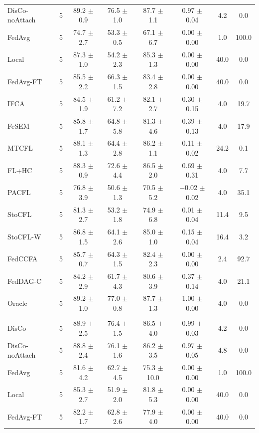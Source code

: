 {{\begin{tabular}{l r c c c c c c}
DisCo-noAttach & 5 & 89.2 $\pm$ 0.9 & 76.5 $\pm$ 1.0 & 87.7 $\pm$ 1.1 & 0.97 $\pm$ 0.04 & 4.2 & 0.0 \\
FedAvg & 5 & 74.7 $\pm$ 2.7 & 53.3 $\pm$ 0.5 & 67.1 $\pm$ 6.7 & 0.00 $\pm$ 0.00 & 1.0 & 100.0 \\
Local & 5 & 87.3 $\pm$ 1.0 & 54.2 $\pm$ 2.3 & 85.3 $\pm$ 1.3 & 0.00 $\pm$ 0.00 & 40.0 & 0.0 \\
FedAvg-FT & 5 & 85.5 $\pm$ 2.2 & 66.3 $\pm$ 1.5 & 83.4 $\pm$ 2.8 & 0.00 $\pm$ 0.00 & 40.0 & 0.0 \\
IFCA & 5 & 84.5 $\pm$ 1.9 & 61.2 $\pm$ 7.2 & 82.1 $\pm$ 2.7 & 0.30 $\pm$ 0.15 & 4.0 & 19.7 \\
FeSEM & 5 & 85.8 $\pm$ 1.7 & 64.8 $\pm$ 5.8 & 81.3 $\pm$ 4.6 & 0.39 $\pm$ 0.13 & 4.0 & 17.9 \\
MTCFL & 5 & 88.1 $\pm$ 1.3 & 64.4 $\pm$ 2.8 & 86.2 $\pm$ 1.1 & 0.11 $\pm$ 0.02 & 24.2 & 0.1 \\
FL+HC & 5 & 88.3 $\pm$ 0.9 & 72.6 $\pm$ 4.4 & 86.5 $\pm$ 2.0 & 0.69 $\pm$ 0.31 & 4.0 & 7.7 \\
PACFL & 5 & 76.8 $\pm$ 3.9 & 50.6 $\pm$ 1.3 & 70.5 $\pm$ 5.2 & $-$0.02 $\pm$ 0.02 & 4.0 & 35.1 \\
StoCFL & 5 & 81.3 $\pm$ 2.7 & 53.2 $\pm$ 1.8 & 74.9 $\pm$ 6.8 & 0.01 $\pm$ 0.04 & 11.4 & 9.5 \\
StoCFL-W & 5 & 86.8 $\pm$ 1.5 & 64.1 $\pm$ 2.6 & 85.0 $\pm$ 1.0 & 0.15 $\pm$ 0.04 & 16.4 & 3.2 \\
FedCCFA & 5 & 85.7 $\pm$ 0.7 & 64.3 $\pm$ 1.5 & 82.4 $\pm$ 2.3 & 0.00 $\pm$ 0.00 & 2.4 & 92.7 \\
FedDAG-C & 5 & 84.2 $\pm$ 2.9 & 61.7 $\pm$ 4.3 & 80.6 $\pm$ 3.9 & 0.37 $\pm$ 0.14 & 4.0 & 21.1 \\
Oracle & 5 & 89.2 $\pm$ 1.0 & 77.0 $\pm$ 0.8 & 87.7 $\pm$ 1.3 & 1.00 $\pm$ 0.00 & 4.0 & 0.0 \\
\addlinespace
\multicolumn{8}{l}{\textit{Rotation + QS}} \\
DisCo & 5 & 88.9 $\pm$ 2.5 & 76.4 $\pm$ 1.5 & 86.5 $\pm$ 4.0 & 0.99 $\pm$ 0.03 & 4.2 & 0.0 \\
DisCo-noAttach & 5 & 88.8 $\pm$ 2.4 & 76.1 $\pm$ 1.6 & 86.2 $\pm$ 3.5 & 0.97 $\pm$ 0.05 & 4.8 & 0.0 \\
FedAvg & 5 & 81.6 $\pm$ 4.2 & 62.7 $\pm$ 4.5 & 75.3 $\pm$ 10.0 & 0.00 $\pm$ 0.00 & 1.0 & 100.0 \\
Local & 5 & 85.3 $\pm$ 2.7 & 51.9 $\pm$ 2.0 & 81.8 $\pm$ 5.3 & 0.00 $\pm$ 0.00 & 40.0 & 0.0 \\
FedAvg-FT & 5 & 82.2 $\pm$ 1.7 & 62.8 $\pm$ 2.6 & 77.9 $\pm$ 4.0 & 0.00 $\pm$ 0.00 & 40.0 & 0.0 \\

\end{tabular}}}
